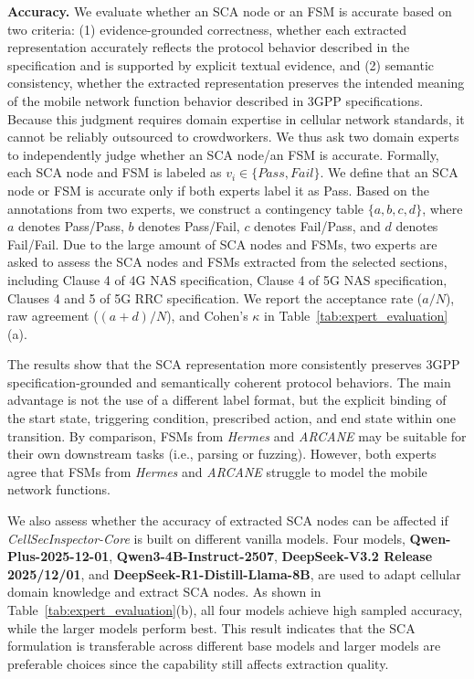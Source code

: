 \documentclass[sigconf]{acmart}
\newcommand{\core}{\textit{CellSecInspector-Core}\xspace}
\begin{document}
{\noindent \textbf{Accuracy.} We evaluate whether an SCA node or an FSM is accurate based on two criteria: (1) evidence-grounded correctness, whether each extracted representation accurately reflects the protocol behavior described in the specification and is supported by explicit textual evidence, and (2) semantic consistency, whether the extracted representation preserves the intended meaning of the mobile network function behavior described in 3GPP specifications. Because this judgment requires domain expertise in cellular network standards, it cannot be reliably outsourced to crowdworkers. We thus ask two domain experts to independently judge whether an SCA node/an FSM is accurate. Formally, each SCA node and FSM is labeled as $v_i \in \{Pass, Fail\}$. We define that an SCA node or FSM is accurate only if both experts label it as Pass. Based on the annotations from two experts, we construct a contingency table $\{a,b,c,d\}$, where $a$ denotes Pass/Pass, $b$ denotes Pass/Fail, $c$ denotes Fail/Pass, and $d$ denotes Fail/Fail. Due to the large amount of SCA nodes and FSMs, two experts are asked to assess the SCA nodes and FSMs extracted from the selected sections, including Clause 4 of 4G NAS specification, Clause 4 of 5G NAS specification, Clauses 4 and 5 of 5G RRC specification. 
We report the acceptance rate ($a/N$), raw agreement ($(a+d)/N$), and Cohen's $\kappa$ in Table~\ref{tab:expert_evaluation} (a).





The results show that the SCA representation more consistently preserves 3GPP specification-grounded and semantically coherent protocol behaviors. The main advantage is not the use of a different label format, but the explicit binding of the start state, triggering condition, prescribed action, and end state within one transition. By comparison, FSMs from \textit{Hermes} and \textit{ARCANE} may be suitable for their own downstream tasks (i.e., parsing or fuzzing). However, both experts agree that FSMs from \textit{Hermes} and \textit{ARCANE} struggle to model the mobile network functions.

We also assess whether the accuracy of extracted SCA nodes can be affected if \core is built on different vanilla models. Four models, \textbf{Qwen-Plus-2025-12-01}, \textbf{Qwen3-4B-Instruct-2507}, \textbf{DeepSeek-V3.2 Release 2025/12/01}, and \textbf{DeepSeek-R1-Distill-Llama-8B}, are used to adapt cellular domain knowledge and extract SCA nodes. As shown in Table~\ref{tab:expert_evaluation}(b), all four models achieve high sampled accuracy, while the larger models perform best. This result indicates that the SCA formulation is transferable across different base models and larger models are preferable choices since the capability still affects extraction quality. 







}
\end{document}
